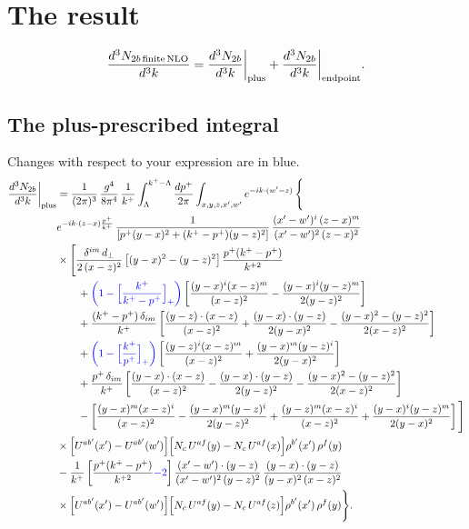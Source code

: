 \documentclass[10pt]{article}
\newcommand{\new}[1]{{\color{blue}#1}}
\begin{document}
\section{The result}
\begin{equation}
\frac{d^{3}N_{2b\,\rm finite\,NLO}}{d^{3}k}=\frac{d^{3}N_{2b}}{d^{3}k}\bigg|_{\rm plus}+\frac{d^{3}N_{2b}}{d^{3}k}\bigg|_{\rm endpoint}.
\end{equation}

\subsection{The plus-prescribed integral}
Changes with respect to your expression are in blue.
\begin{align}
\frac{d^{3}N_{2b}}{d^{3}k}\bigg|_{\rm plus} & = \frac{1}{(2\pi)^{3}}\,\frac{g^{4}}{8\pi^{4}}\,\frac{1}{k^{+}}\int_{\Lambda}^{k^{+}-\Lambda}\frac{dp^{+}}{2\pi}\int_{x,y,z,x',w'}e^{-ik\cdot(w'-z)}\,\Bigg\{\notag\\
&e^{-ik\cdot(z-x)\frac{p^{+}}{k^{+}}}\,\frac{1}{\left[p^{+}(y-x)^{2}+(k^{+}-p^{+})(y-z)^{2}\right]}\,\frac{(x'-w')^{i}\,(z-x)^{m}}{(x'-w')^{2}\,(z-x)^{2}}\notag\\
&\times\Bigg[\frac{\delta^{im}\,d_{\perp}}{2\,(x-z)^{2}}\left[(y-x)^{2}-(y-z)^{2}\right]\frac{p^{+}(k^{+}-p^{+})}{k^{+2}}\notag\\
&\qquad+\new{\bigg(1-\Big[\frac{k^{+}}{k^{+}-p^{+}}\Big]_{+}\bigg)}\left[\frac{(y-x)^{i}(x-z)^{m}}{(x-z)^{2}}-\frac{(y-x)^{i}(y-z)^{m}}{2(y-z)^{2}}\right]\notag\\
&\qquad+\frac{(k^{+}-p^{+})\,\delta_{im}}{k^{+}}\left[\frac{(y-z)\cdot(x-z)}{(x-z)^{2}}+\frac{(y-x)\cdot(y-z)}{2(y-x)^{2}}-\frac{(y-x)^{2}-(y-z)^{2}}{2(x-z)^{2}}\right]\notag\\
&\qquad+\new{\bigg(1-\Big[\frac{k^{+}}{p^{+}}\Big]_{+}\bigg)}\left[\frac{(y-z)^{i}(x-z)^{m}}{(x-z)^{2}}+\frac{(y-x)^{m}(y-z)^{i}}{2(y-x)^{2}}\right]\notag\\
&\qquad+\frac{p^{+}\,\delta_{im}}{k^{+}}\left[\frac{(y-x)\cdot(x-z)}{(x-z)^{2}}-\frac{(y-x)\cdot(y-z)}{2(y-z)^{2}}-\frac{(y-x)^{2}-(y-z)^{2}}{2(x-z)^{2}}\right]\notag\\
&\qquad-\left[\frac{(y-x)^{m}(x-z)^{i}}{(x-z)^{2}}-\frac{(y-x)^{m}(y-z)^{i}}{2(y-z)^{2}}+\frac{(y-z)^{m}(x-z)^{i}}{(x-z)^{2}}+\frac{(y-x)^{i}(y-z)^{m}}{2(y-x)^{2}}\right]\Bigg]\notag\\
&\times\Big[U^{ab'}(x')-U^{ab'}(w')\Big]\Big[N_{c}\,U^{af}(y)-N_{c}\,U^{af}(x)\Big]\rho^{b'}(x')\,\rho^{f}(y)\notag\\
&-\frac{1}{k^{+}}\left[\frac{p^{+}(k^{+}-p^{+})}{k^{+2}}\new{-2}\right]
\frac{(x'-w')\cdot(y-z)}{(x'-w')^{2}\,(y-z)^{2}}\,\frac{(y-x)\cdot(y-z)}{(y-x)^{2}\,(x-z)^{2}}\notag\\
&\times\Big[U^{ab'}(x')-U^{ab'}(w')\Big]\Big[N_{c}\,U^{af}(y)-N_{c}\,U^{af}(z)\Big]\rho^{b'}(x')\,\rho^{f}(y)\Bigg\}.
\label{eq:plus}
\end{align}
\end{document}
